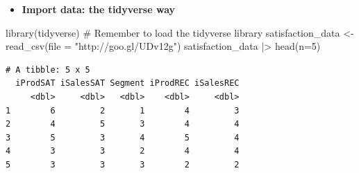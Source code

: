 \documentclass[
  ignorenonframetext,
]{beamer}
\newenvironment{Shaded}{\begin{snugshade}}{\end{snugshade}}
\newcommand{\AttributeTok}[1]{\textcolor[rgb]{0.40,0.45,0.13}{#1}}
\newcommand{\CommentTok}[1]{\textcolor[rgb]{0.37,0.37,0.37}{#1}}
\newcommand{\DecValTok}[1]{\textcolor[rgb]{0.68,0.00,0.00}{#1}}
\newcommand{\FunctionTok}[1]{\textcolor[rgb]{0.28,0.35,0.67}{#1}}
\newcommand{\NormalTok}[1]{\textcolor[rgb]{0.00,0.23,0.31}{#1}}
\newcommand{\OtherTok}[1]{\textcolor[rgb]{0.00,0.23,0.31}{#1}}
\newcommand{\SpecialCharTok}[1]{\textcolor[rgb]{0.37,0.37,0.37}{#1}}
\newcommand{\StringTok}[1]{\textcolor[rgb]{0.13,0.47,0.30}{#1}}
\providecommand{\tightlist}{%
  \setlength{\itemsep}{0pt}\setlength{\parskip}{0pt}}\usepackage{longtable,booktabs,array}
\begin{document}
\begin{frame}[fragile]{}
\label{section-4}
\begin{itemize}
\tightlist
\item
  \textbf{Import data: the tidyverse way}
\end{itemize}

\tiny

\begin{Shaded}
\begin{Highlighting}[]
\FunctionTok{library}\NormalTok{(tidyverse) }\CommentTok{\# Remember to load the tidyverse library}
\NormalTok{satisfaction\_data }\OtherTok{\textless{}{-}} \FunctionTok{read\_csv}\NormalTok{(}\AttributeTok{file =} \StringTok{"http://goo.gl/UDv12g"}\NormalTok{)}
\NormalTok{satisfaction\_data }\SpecialCharTok{|\textgreater{}} \FunctionTok{head}\NormalTok{(}\AttributeTok{n=}\DecValTok{5}\NormalTok{)}
\end{Highlighting}
\end{Shaded}

\begin{verbatim}
# A tibble: 5 x 5
  iProdSAT iSalesSAT Segment iProdREC iSalesREC
     <dbl>     <dbl>   <dbl>    <dbl>     <dbl>
1        6         2       1        4         3
2        4         5       3        4         4
3        5         3       4        5         4
4        3         3       2        4         4
5        3         3       3        2         2
\end{verbatim}
\end{frame}
\end{document}
